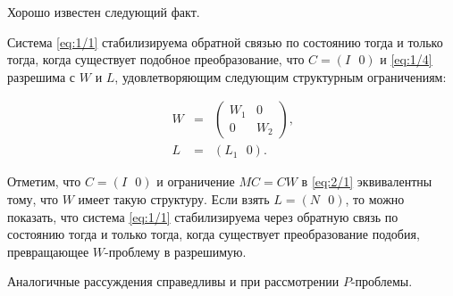 Хорошо известен\cite{PERES} следующий факт.

\begin{teo}
\label{teo:2/4}
Система \vref{eq:1/1} стабилизируема обратной связью по состоянию тогда и только тогда, когда существует подобное преобразование, что $C=(I~~~0)$ и \vref{eq:1/4} разрешима с $W$ и $L$, удовлетворяющим следующим структурным ограничениям:

\begin{eqnarray*}
W&=&\left( \begin{array}{cc}
            W_1 &   0 \\
            0   & W_2
           \end{array} \right)\mbox{,} \\
L&=&\left( L_1~~~0 \right)\mbox{.}
\end{eqnarray*}

\end{teo}

Отметим, что $C=(I~~~0)$ и ограничение $MC=CW$ в \vref{eq:2/1} эквивалентны тому, что $W$ имеет такую структуру. Если взять $L=(N~~~0)$, то можно показать\cite{PERES}, что система \vref{eq:1/1} стабилизируема через обратную связь по состоянию тогда и только тогда, когда существует преобразование подобия, превращающее $W$-проблему в разрешимую.\br

Аналогичные рассуждения справедливы и при рассмотрении $P$-проб\-лемы.
